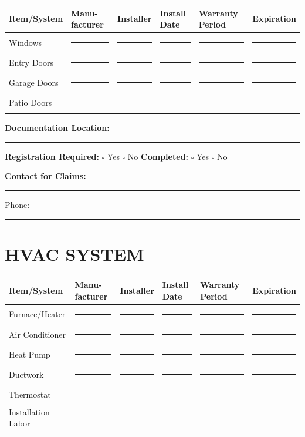 \documentclass[11pt,letterpaper]{article}
\begin{document}
\begin{tabular}{|p{1.5in}|p{1in}|p{1in}|p{0.8in}|p{0.8in}|p{1in}|}
\hline
\textbf{Item/System} & \textbf{Manu-facturer} & \textbf{Installer} & \textbf{Install Date} & \textbf{Warranty Period} & \textbf{Expiration} \\
\hline
Windows & \rule{0.8in}{0.4pt} & \rule{0.8in}{0.4pt} & \rule{0.6in}{0.4pt} & \rule{0.6in}{0.4pt} & \rule{0.8in}{0.4pt} \\
\hline
Entry Doors & \rule{0.8in}{0.4pt} & \rule{0.8in}{0.4pt} & \rule{0.6in}{0.4pt} & \rule{0.6in}{0.4pt} & \rule{0.8in}{0.4pt} \\
\hline
Garage Doors & \rule{0.8in}{0.4pt} & \rule{0.8in}{0.4pt} & \rule{0.6in}{0.4pt} & \rule{0.6in}{0.4pt} & \rule{0.8in}{0.4pt} \\
\hline
Patio Doors & \rule{0.8in}{0.4pt} & \rule{0.8in}{0.4pt} & \rule{0.6in}{0.4pt} & \rule{0.6in}{0.4pt} & \rule{0.8in}{0.4pt} \\
\hline
\end{tabular}

\vspace{6pt}

\textbf{Documentation Location:} \rule{8cm}{0.4pt}

\textbf{Registration Required:} $\square$ Yes $\square$ No \hspace{0.3in} \textbf{Completed:} $\square$ Yes $\square$ No

\textbf{Contact for Claims:} \rule{7cm}{0.4pt} Phone: \rule{3cm}{0.4pt}

\newpage

\section*{HVAC SYSTEM}

\begin{tabular}{|p{1.5in}|p{1in}|p{1in}|p{0.8in}|p{0.8in}|p{1in}|}
\hline
\textbf{Item/System} & \textbf{Manu-facturer} & \textbf{Installer} & \textbf{Install Date} & \textbf{Warranty Period} & \textbf{Expiration} \\
\hline
Furnace/Heater & \rule{0.8in}{0.4pt} & \rule{0.8in}{0.4pt} & \rule{0.6in}{0.4pt} & \rule{0.6in}{0.4pt} & \rule{0.8in}{0.4pt} \\
\hline
Air Conditioner & \rule{0.8in}{0.4pt} & \rule{0.8in}{0.4pt} & \rule{0.6in}{0.4pt} & \rule{0.6in}{0.4pt} & \rule{0.8in}{0.4pt} \\
\hline
Heat Pump & \rule{0.8in}{0.4pt} & \rule{0.8in}{0.4pt} & \rule{0.6in}{0.4pt} & \rule{0.6in}{0.4pt} & \rule{0.8in}{0.4pt} \\
\hline
Ductwork & \rule{0.8in}{0.4pt} & \rule{0.8in}{0.4pt} & \rule{0.6in}{0.4pt} & \rule{0.6in}{0.4pt} & \rule{0.8in}{0.4pt} \\
\hline
Thermostat & \rule{0.8in}{0.4pt} & \rule{0.8in}{0.4pt} & \rule{0.6in}{0.4pt} & \rule{0.6in}{0.4pt} & \rule{0.8in}{0.4pt} \\
\hline
Installation Labor & \rule{0.8in}{0.4pt} & \rule{0.8in}{0.4pt} & \rule{0.6in}{0.4pt} & \rule{0.6in}{0.4pt} & \rule{0.8in}{0.4pt} \\
\hline
\end{tabular}
\end{document}
